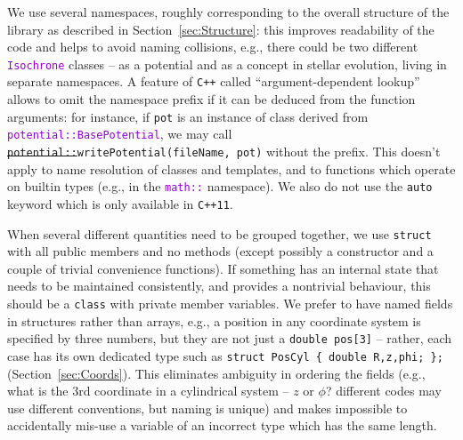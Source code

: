 \documentclass[12pt]{article}
\newcommand{\Cpp}  {\texttt{C++}\xspace}
\newcommand{\CppII}{\texttt{C++11}\xspace}
\newcommand{\ttt}[1]{\textcolor{darkviolet}{\texttt{#1}}}
\begin{document}
We use several namespaces, roughly corresponding to the overall structure of the library as described in Section~\ref{sec:Structure}: this improves readability of the code and helps to avoid naming collisions, e.g., there could be two different \ttt{Isochrone} classes -- as a potential and as a concept in stellar evolution, living in separate namespaces. A feature of \Cpp called ``argument-dependent lookup'' allows to omit the namespace prefix if it can be deduced from the function arguments: for instance, if \texttt{pot} is an instance of class derived from \ttt{potential::BasePotential}, we may call \texttt{\sout{potential::}writePotential(fileName, pot)} without the prefix. This doesn't apply to name resolution of classes and templates, and to functions which operate on builtin types (e.g., in the \ttt{math::} namespace). We also do not use the \texttt{auto} keyword which is only available in \CppII.

When several different quantities need to be grouped together, we use \texttt{struct} with all public members and no methods (except possibly a constructor and a couple of trivial convenience functions). If something has an internal state that needs to be maintained consistently, and provides a nontrivial behaviour, this should be a \texttt{class} with private member variables. We prefer to have named fields in structures rather than arrays, e.g., a position in any coordinate system is specified by three numbers, but they are not just a \texttt{double pos[3]} -- rather, each case has its own dedicated type such as \texttt{struct PosCyl \{ double R,z,phi; \};} (Section~\ref{sec:Coords}). This eliminates ambiguity in ordering the fields (e.g., what is the 3rd coordinate in a cylindrical system -- $z$ or $\phi$? different codes may use different conventions, but naming is unique) and makes impossible to accidentally mis-use a variable of an incorrect type which has the same length.
\end{document}
